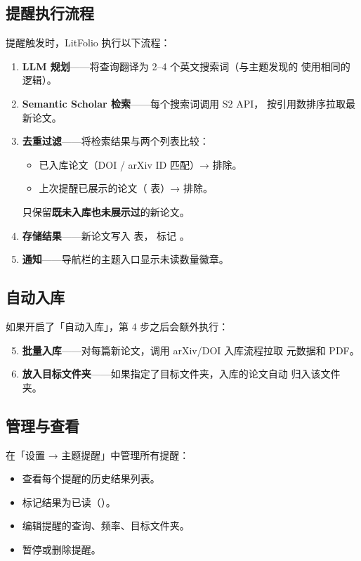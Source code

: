 \subsection{提醒执行流程}

提醒触发时，LitFolio 执行以下流程：

\begin{enumerate}
  \item \textbf{LLM 规划}——将查询翻译为 2--4 个英文搜索词（与主题发现的
     使用相同的逻辑）。
  \item \textbf{Semantic Scholar 检索}——每个搜索词调用 S2 API，
    按引用数排序拉取最新论文。
  \item \textbf{去重过滤}——将检索结果与两个列表比较：
    \begin{itemize}
      \item 已入库论文（DOI / arXiv ID 匹配）→ 排除。
      \item 上次提醒已展示的论文（ 表）→ 排除。
    \end{itemize}
    只保留\textbf{既未入库也未展示过}的新论文。
  \item \textbf{存储结果}——新论文写入  表，
    标记 。
  \item \textbf{通知}——导航栏的主题入口显示未读数量徽章。
\end{enumerate}

\subsection{自动入库}

如果开启了「自动入库」，第 4 步之后会额外执行：

\begin{enumerate}
  \setcounter{enumi}{4}
  \item \textbf{批量入库}——对每篇新论文，调用 arXiv/DOI 入库流程拉取
    元数据和 PDF。
  \item \textbf{放入目标文件夹}——如果指定了目标文件夹，入库的论文自动
    归入该文件夹。
\end{enumerate}

\subsection{管理与查看}

在「设置 → 主题提醒」中管理所有提醒：

\begin{itemize}
  \item 查看每个提醒的历史结果列表。
  \item 标记结果为已读（）。
  \item 编辑提醒的查询、频率、目标文件夹。
  \item 暂停或删除提醒。
\end{itemize}

